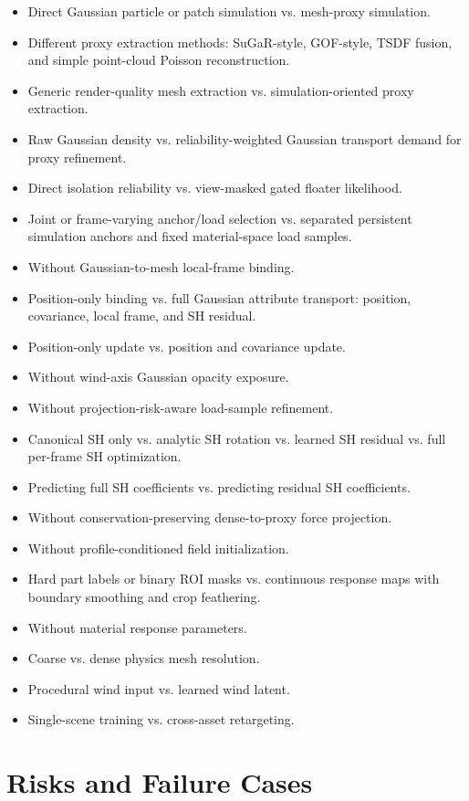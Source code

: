 \documentclass[11pt]{article}
\begin{document}
\begin{itemize}
  \item Direct Gaussian particle or patch simulation vs. mesh-proxy simulation.
  \item Different proxy extraction methods: SuGaR-style, GOF-style, TSDF fusion, and simple point-cloud Poisson reconstruction.
  \item Generic render-quality mesh extraction vs. simulation-oriented proxy extraction.
  \item Raw Gaussian density vs. reliability-weighted Gaussian transport demand for proxy refinement.
  \item Direct isolation reliability vs. view-masked gated floater likelihood.
  \item Joint or frame-varying anchor/load selection vs. separated persistent simulation anchors and fixed material-space load samples.
  \item Without Gaussian-to-mesh local-frame binding.
  \item Position-only binding vs. full Gaussian attribute transport: position, covariance, local frame, and SH residual.
  \item Position-only update vs. position and covariance update.
  \item Without wind-axis Gaussian opacity exposure.
  \item Without projection-risk-aware load-sample refinement.
  \item Canonical SH only vs. analytic SH rotation vs. learned SH residual vs. full per-frame SH optimization.
  \item Predicting full SH coefficients vs. predicting residual SH coefficients.
  \item Without conservation-preserving dense-to-proxy force projection.
  \item Without profile-conditioned field initialization.
  \item Hard part labels or binary ROI masks vs. continuous response maps with boundary smoothing and crop feathering.
  \item Without material response parameters.
  \item Coarse vs. dense physics mesh resolution.
  \item Procedural wind input vs. learned wind latent.
  \item Single-scene training vs. cross-asset retargeting.
\end{itemize}

\section{Risks and Failure Cases}
\end{document}
